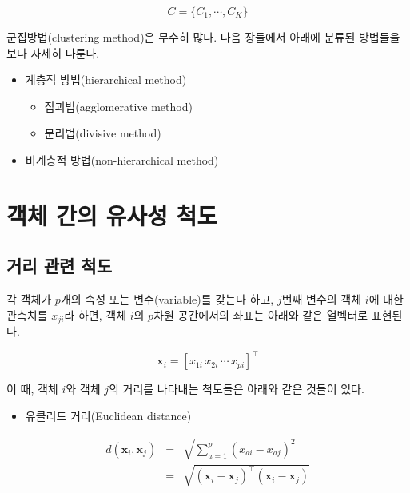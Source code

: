 \documentclass[]{book}
\providecommand{\tightlist}{%
  \setlength{\itemsep}{0pt}\setlength{\parskip}{0pt}}
\begin{document}
\begin{equation*}
C = \{C_1, \cdots, C_K\}
\end{equation*}

군집방법(clustering method)은 무수히 많다. 다음 장들에서 아래에 분류된 방법들을 보다 자세히 다룬다.

\begin{itemize}
\tightlist
\item
  계층적 방법(hierarchical method)

  \begin{itemize}
  \tightlist
  \item
    집괴법(agglomerative method)
  \item
    분리법(divisive method)
  \end{itemize}
\item
  비계층적 방법(non-hierarchical method)
\end{itemize}

\hypertarget{object-similarity-metric}{%
\section{객체 간의 유사성 척도}\label{object-similarity-metric}}

\hypertarget{object-distance-metric}{%
\subsection{거리 관련 척도}\label{object-distance-metric}}

각 객체가 \(p\)개의 속성 또는 변수(variable)를 갖는다 하고, \(j\)번째 변수의 객체 \(i\)에 대한 관측치를 \(x_{ji}\)라 하면, 객체 \(i\)의 \(p\)차원 공간에서의 좌표는 아래와 같은 열벡터로 표현된다.

\begin{equation*}
\mathbf{x}_{i} = [x_{1i} \, x_{2i} \, \cdots \, x_{pi}]^\top
\end{equation*}

이 때, 객체 \(i\)와 객체 \(j\)의 거리를 나타내는 척도들은 아래와 같은 것들이 있다.

\begin{itemize}
\tightlist
\item
  유클리드 거리(Euclidean distance)
\end{itemize}

\begin{eqnarray*}
d(\mathbf{x}_i, \mathbf{x}_j) &=& \sqrt{\sum_{a = 1}^{p} \left(x_{ai} - x_{aj}\right)^2}\\
&=& \sqrt{(\mathbf{x}_i - \mathbf{x}_j)^\top (\mathbf{x}_i - \mathbf{x}_j)}
\end{eqnarray*}
\end{document}
